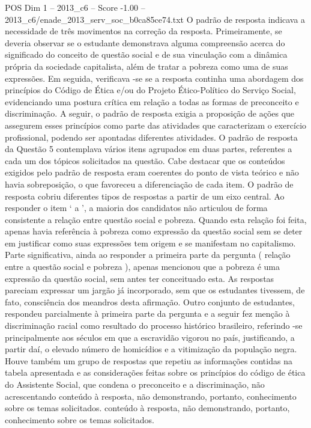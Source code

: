 \begin{textsample}{POS Dim 1 – 2013\_c6 – Score -1.00 – 2013\_c6/enade\_2013\_serv\_soc\_b0ca85ce74.txt}
O padrão de resposta indicava a necessidade de três movimentos na correção da resposta.
Primeiramente, se deveria observar se o estudante demonstrava alguma compreensão acerca do significado do conceito de questão social e de sua vinculação com a dinâmica própria da sociedade capitalista, além de tratar a pobreza como uma de suas expressões.
Em seguida, verificava -se se a resposta continha uma abordagem dos princípios do Código de Ética e/ou do Projeto Ético-Político do Serviço Social, evidenciando uma postura crítica em relação a todas as formas de preconceito e discriminação.
A seguir, o padrão de resposta exigia a proposição de ações que assegurem esses princípios como parte das atividades que caracterizam o exercício profissional, podendo ser apontadas diferentes atividades.
O padrão de resposta da Questão 5 contemplava vários itens agrupados em duas partes, referentes a cada um dos tópicos solicitados na questão.
Cabe destacar que os conteúdos exigidos pelo padrão de resposta eram coerentes do ponto de vista teórico e não havia sobreposição, o que favoreceu a diferenciação de cada item.
O padrão de resposta cobriu diferentes tipos de respostas a partir de um eixo central.
Ao responder o item ‘ a ’, a maioria dos candidatos não articulou de forma consistente a relação entre questão social e pobreza.
Quando esta relação foi feita, apenas havia referência à pobreza como expressão da questão social sem se deter em justificar como suas expressões tem origem e se manifestam no capitalismo.
Parte significativa, ainda ao responder a primeira parte da pergunta ( relação entre a questão social e pobreza ), apenas mencionou que a pobreza é uma expressão da questão social, sem antes ter conceituado esta.
As respostas pareciam expressar um jargão já incorporado, sem que os estudantes tivessem, de fato, consciência dos meandros desta afirmação.
Outro conjunto de estudantes, respondeu parcialmente à primeira parte da pergunta e a seguir fez menção à discriminação racial como resultado do processo histórico brasileiro, referindo -se principalmente aos séculos em que a escravidão vigorou no país, justificando, a partir daí, o elevado número de homicídios e a vitimização da população negra.
Houve também um grupo de respostas que repetiu as informações contidas na tabela apresentada e as considerações feitas sobre os princípios do código de ética do Assistente Social, que condena o preconceito e a discriminação, não acrescentando conteúdo à resposta, não demonstrando, portanto, conhecimento sobre os temas solicitados. conteúdo à resposta, não demonstrando, portanto, conhecimento sobre os temas solicitados.

\end{textsample}
